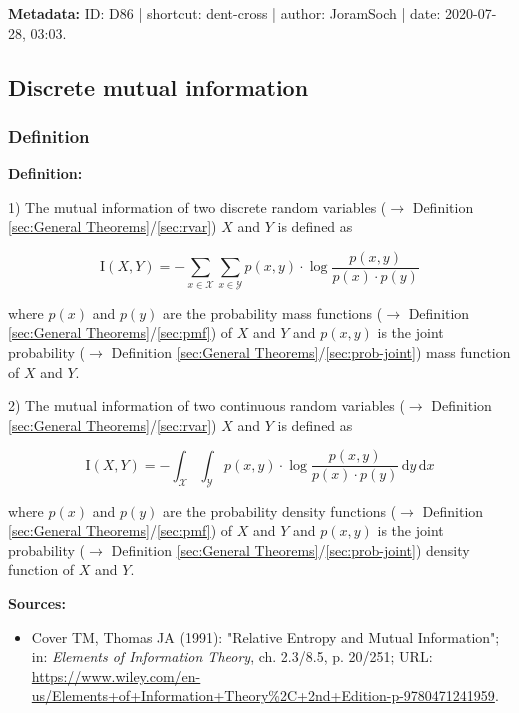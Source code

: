 \documentclass[a4paper,12pt,twoside]{book}
\begin{document}
\vspace{1em}
\textbf{Metadata:} ID: D86 | shortcut: dent-cross | author: JoramSoch | date: 2020-07-28, 03:03.
\vspace{1em}



\subsection{Discrete mutual information}

\subsubsection[\textit{Definition}]{Definition} \label{sec:mi}
\setcounter{equation}{0}

\textbf{Definition:}

1) The mutual information of two discrete random variables ($\rightarrow$ Definition \ref{sec:General Theorems}/\ref{sec:rvar}) $X$ and $Y$ is defined as

\begin{equation} \label{eq:mi-mi-disc}
\mathrm{I}(X,Y) = - \sum_{x \in \mathcal{X}} \sum_{x \in \mathcal{Y}} p(x,y) \cdot \log \frac{p(x,y)}{p(x) \cdot p(y)}
\end{equation}

where $p(x)$ and $p(y)$ are the probability mass functions ($\rightarrow$ Definition \ref{sec:General Theorems}/\ref{sec:pmf}) of $X$ and $Y$ and $p(x,y)$ is the joint probability ($\rightarrow$ Definition \ref{sec:General Theorems}/\ref{sec:prob-joint}) mass function of $X$ and $Y$.

2) The mutual information of two continuous random variables ($\rightarrow$ Definition \ref{sec:General Theorems}/\ref{sec:rvar}) $X$ and $Y$ is defined as

\begin{equation} \label{eq:mi-mi-cont}
\mathrm{I}(X,Y) = - \int_{\mathcal{X}} \int_{\mathcal{Y}} p(x,y) \cdot \log \frac{p(x,y)}{p(x) \cdot p(y)} \, \mathrm{d}y \, \mathrm{d}x
\end{equation}

where $p(x)$ and $p(y)$ are the probability density functions ($\rightarrow$ Definition \ref{sec:General Theorems}/\ref{sec:pmf}) of $X$ and $Y$ and $p(x,y)$ is the joint probability ($\rightarrow$ Definition \ref{sec:General Theorems}/\ref{sec:prob-joint}) density function of $X$ and $Y$.


\vspace{1em}
\textbf{Sources:}
\begin{itemize}
\item Cover TM, Thomas JA (1991): "Relative Entropy and Mutual Information"; in: \textit{Elements of Information Theory}, ch. 2.3/8.5, p. 20/251; URL: \url{https://www.wiley.com/en-us/Elements+of+Information+Theory%2C+2nd+Edition-p-9780471241959}.
\end{itemize}
\end{document}

